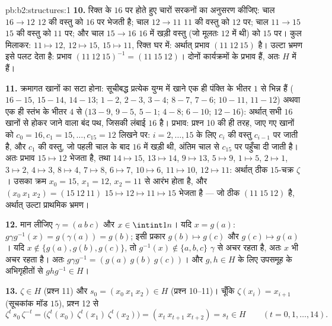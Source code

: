 \begin{solution}{pb:b2:structures:1}
\textbf{10.} रिक्त के $16$ पर होते हुए चारों सरकनों का अनुसरण कीजिए:
चाल $16 \to 12$ $12$ की वस्तु को $16$ पर भेजती है; चाल $12 \to 11$ $11$ की वस्तु को $12$
पर; चाल $11 \to 15$ $15$ की वस्तु को $11$ पर; और चाल $15 \to 16$ $16$ में खड़ी वस्तु
(जो मूलतः $12$ में थी) को $15$ पर। कुल मिलाकर: $11 \mapsto
12$, $12 \mapsto 15$, $15 \mapsto 11$,
रिक्त घर में: अर्थात् प्रभाव $(11\ 12\ 15)$ है। उल्टा भ्रमण इसे पलट देता है:
प्रभाव $(11\ 12\
15)^{-1} = (11\ 15\ 12)$। दोनों कार्यक्रमों के प्रभाव हैं, अतः $H$ में हैं।

\textbf{11.} क्रमागत खानों का सटा होना: सूचीबद्ध प्रत्येक युग्म में
खाने एक ही पंक्ति के भीतर $1$ से भिन्न हैं ($16{-}15$, $15{-}14$, $14{-}13$; $1{-}2$, $2{-}3$,
$3{-}4$; $8{-}7$, $7{-}6$; $10{-}11$, $11{-}12$) अथवा एक ही स्तंभ के भीतर $4$ से ($13{-}9$,
$9{-}5$, $5{-}1$; $4{-}8$; $6{-}10$; $12{-}16$): अर्थात् सभी $16$ खानों से होकर जाने
वाला बंद पथ, जिसकी लंबाई $16$ है। प्रभाव: प्रश्न 10 की ही तरह, जाए गए
खानों को $c_0 = 16, c_1 = 15,
\dots, c_{15} = 12$ लिखने पर: $i = 2, \dots, 15$ के लिए $c_i$ की वस्तु $c_{i-1}$ पर जाती है, और
$c_1$ की वस्तु, जो पहली चाल के बाद $16$ में खड़ी थी, अंतिम चाल से $c_{15}$
पर पहुँचा दी जाती है। अतः प्रभाव $15 \mapsto 12$ भेजता है, तथा $14 \mapsto 15$, $13
\mapsto 14$, $9 \mapsto 13$,
$5 \mapsto 9$, $1 \mapsto 5$, $2
\mapsto 1$, $3 \mapsto 2$, $4 \mapsto 3$, $8 \mapsto 4$, $7
\mapsto 8$, $6 \mapsto 7$, $10 \mapsto 6$, $11 \mapsto 10$, $12
\mapsto 11$:
अर्थात् ठीक $15$-चक्र $\zeta$। उसका  क्रम $x_0 = 15$, $x_1 = 12$, $x_2 = 11$ से आरंभ
होता है, और $(x_0\ x_1\ x_2)
= (15\ 12\ 11)$ $15 \mapsto 12 \mapsto 11 \mapsto 15$ भेजता है --- जो ठीक $(11\ 15\ 12)$ है, अर्थात् उल्टा
प्राथमिक भ्रमण।

\textbf{12.} मान लीजिए $\gamma = (a\ b\ c)$ और $x \in \intint1n$। यदि $x = g(a)$: $g\gamma g^{-1}(x) = g(\gamma(a)) = g(b)$; इसी प्रकार $g(b) \mapsto g(c)$ और
$g(c) \mapsto g(a)$। यदि $x \notin
\{g(a), g(b), g(c)\}$, तो $g^{-1}(x) \notin \{a,b,c\}$ $\gamma$ से अचर रहता है, अतः $x$ भी अचर रहता है। अतः
$g\gamma g^{-1} =
(g(a)\ g(b)\ g(c))$। और $g, h \in H$ के लिए उपसमूह के अभिगृहीतों से $ghg^{-1} \in H$।

\textbf{13.} $\zeta \in H$ (प्रश्न 11) और $s_0 = (x_0\ x_1\
x_2) \in H$ (प्रश्न 10--11)। चूँकि $\zeta(x_i) = x_{i+1}$
(सूचकांक मॉड $15$), प्रश्न 12 से
\[
\zeta^{t}\,s_0\,\zeta^{-t}
= \bigl(\zeta^t(x_0)\ \zeta^t(x_1)\ \zeta^t(x_2)\bigr)
= (x_t\ x_{t+1}\ x_{t+2}) = s_t \in H
\qquad (t = 0, 1, \dots, 14).
\]


\end{solution}
